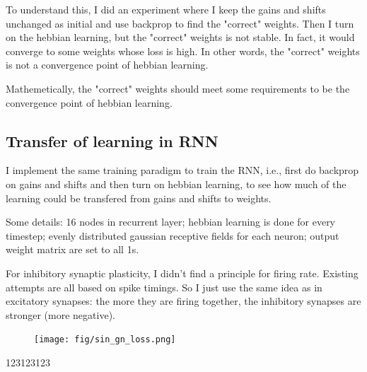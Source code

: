 \documentclass[12pt, a4paper]{article}
\begin{document}
To understand this, I did an experiment where I keep the gains and shifts unchanged as initial and use backprop to find the "correct" weights. Then I turn on the hebbian learning, but the "correct" weights is not stable. In fact, it would converge to some weights whose loss is high. In other words, the "correct" weights is not a convergence point of hebbian learning.


Mathemetically, the "correct" weights should meet some requirements to be the convergence point of hebbian learning.


\newpage

\subsection*{Transfer of learning in RNN}

I implement the same training paradigm to train the RNN, i.e., first do backprop on gains and shifts and then turn on hebbian learning, to see how much of the learning could be transfered from gains and shifts to weights.

Some details: 16 nodes in recurrent layer; hebbian learning is done for every timestep; evenly distributed gaussian receptive fields for each neuron; output weight matrix are set to all 1s.

For inhibitory synaptic plasticity, I didn't find a principle for firing rate. Existing attempts are all based on spike timings. So I just use the same idea as in excitatory synapses: the more they are firing together, the inhibitory synapses are stronger (more negative).

\begin{figure}[H]
    \centering
    \texttt{[image: fig/sin\_gn\_loss.png]} \\
    \label{fig:1}
\end{figure}

123123123

\newpage
\end{document}
